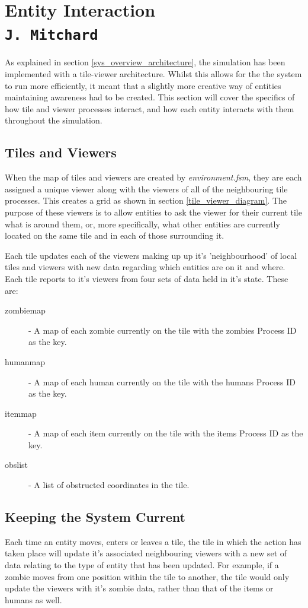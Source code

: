 \pagestyle{empty}
\section{Entity Interaction\\{\small\tt J.~Mitchard}}
\label{entity_interactions}
As explained in section \ref{sys_overview_architecture}, the simulation has been implemented with a tile-viewer architecture. Whilst this allows for the the system to run more efficiently, it meant that a slightly more creative way of entities maintaining awareness had to be created. This section will cover the specifics of how tile and viewer processes interact, and how each entity interacts with them throughout the simulation.

\subsection{Tiles and Viewers}
When the map of tiles and viewers are created by \emph{environment.fsm}, they are each assigned a unique viewer along with the viewers of all of the neighbouring tile processes. This creates a grid as shown in section \ref{tile_viewer_diagram}. The purpose of these viewers is to allow entities to ask the viewer for their current tile what is around them, or, more specifically, what other entities are currently located on the same tile and in each of those surrounding it.

Each tile updates each of the viewers making up up it's 'neighbourhood' of local tiles and viewers with new data regarding which entities are on it and where. Each tile reports to it's viewers from four sets of data held in it's state. These are:
\begin{description}
  \item[zombie\textunderscore map] - A map of each zombie currently on the tile with the zombies Process ID as the key.
  \item[human\textunderscore map] - A map of each human currently on the tile with the humans Process ID as the key.
  \item[item\textunderscore map] - A map of each item currently on the tile with the items Process ID as the key.
  \item[obs\textunderscore list] - A list of obstructed coordinates in the tile.
\end{description}

\subsection{Keeping the System Current}
Each time an entity moves, enters or leaves a tile, the tile in which the action has taken place will update it's associated neighbouring viewers with a new set of data relating to the type of entity that has been updated. For example, if a zombie moves from one position within the tile to another, the tile would only update the viewers with it's zombie data, rather than that of the items or humans as well.

